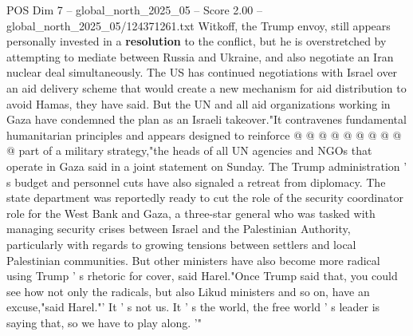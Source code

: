 \begin{textsample}{POS Dim 7 – global\_north\_2025\_05 – Score 2.00 – global\_north\_2025\_05/124371261.txt}
Witkoff, the Trump envoy, still appears personally invested in a \textbf{resolution} to the conflict, but he is overstretched by attempting to mediate between Russia and Ukraine, and also negotiate an Iran nuclear deal simultaneously.
The US has continued negotiations with Israel over an aid delivery scheme that would create a new mechanism for aid distribution to avoid Hamas, they have said.
But the UN and all aid organizations working in Gaza have condemned the plan as an Israeli takeover."It contravenes fundamental humanitarian principles and appears designed to reinforce @ @ @ @ @ @ @ @ @ @ part of a military strategy,"the heads of all UN agencies and NGOs that operate in Gaza said in a joint statement on Sunday.
The Trump administration ' s budget and personnel cuts have also signaled a retreat from diplomacy.
The state department was reportedly ready to cut the role of the security coordinator role for the West Bank and Gaza, a three-star general who was tasked with managing security crises between Israel and the Palestinian Authority, particularly with regards to growing tensions between settlers and local Palestinian communities.
But other ministers have also become more radical using Trump ' s rhetoric for cover, said Harel."Once Trump said that, you could see how not only the radicals, but also Likud ministers and so on, have an excuse,"said Harel."' It ' s not us.
It ' s the world, the free world ' s leader is saying that, so we have to play along. '"

\end{textsample}
